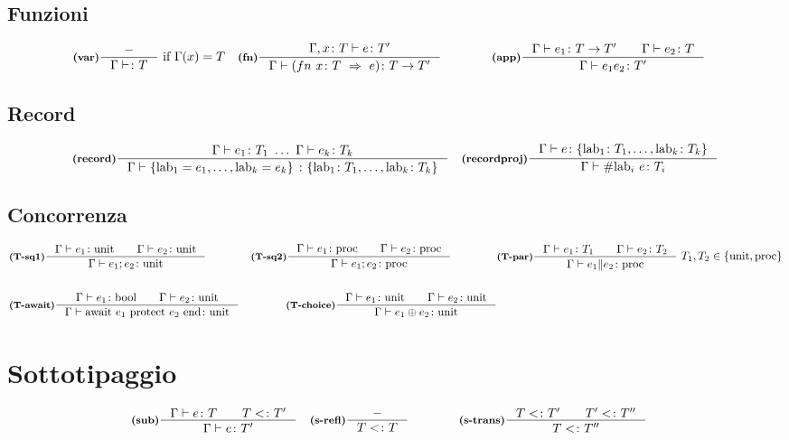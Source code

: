 \documentclass[a4paper, 10pt]{article}
\newcommand{\bool}{\textup{bool}}
\newcommand{\infer}[4]{\inference[\textbf{#1}]{#2}{#3}#4 }
\begin{document}
\subsection*{Funzioni}
	\begin{align*}
		&\infer{(var)}{-}{\Gamma \vdash \colon T}{\ \textup{if}\ \Gamma (x) = T} 
		&\infer{(fn)}{\Gamma , x \colon T \vdash e\colon T'}{\Gamma\vdash (fn\ x\colon T\ \Rightarrow\ e )\colon T\rightarrow T'}{} \qquad\qquad
		&\infer{(app)}{\Gamma \vdash e_1 \colon T \rightarrow T'\qquad \Gamma\vdash e_2\colon T}{\Gamma\vdash e_1 e_2\colon T'}{} 
	\end{align*}
\subsection*{Record}
	\begin{align*}
		&\infer{(record)}{\Gamma \vdash e_1 \colon T_1\ \dots\ \Gamma \vdash e_k \colon T_k}{\Gamma \vdash \{\text{lab}_1 = e_1, \dots, \text{lab}_k = e_k \}\ \colon \{\text{lab}_1 \colon T_1,\dots, \text{lab}_k\colon T_k  \} }{}
		&\infer{(recordproj)}{\Gamma\vdash e\colon \{\text{lab}_1\colon T_1,\dots, \text{lab}_k\colon T_k \} }{\Gamma\vdash \# \text{lab}_i\ e \colon T_i}{}
	\end{align*}
\subsection*{Concorrenza}
	\begin{align*}
		&\infer{(T-sq1)}{\Gamma\vdash e_1\colon\textup{unit}\qquad \Gamma\vdash e_2\colon\textup{unit}}{\Gamma\vdash e_1;e_2\colon \textup{unit}}{}
		&\infer{(T-sq2)}{\Gamma\vdash e_1\colon\textup{proc}\qquad \Gamma\vdash e_2\colon\textup{proc}}{\Gamma\vdash e_1;e_2\colon \textup{proc}}{} \qquad\qquad
		&\infer{(T-par)}{\Gamma\vdash e_1\colon T_1\qquad \Gamma\vdash e_2\colon T_2}{\Gamma\vdash e_1 \| e_2\colon \textup{proc}}{\ T_1, T_2 \in \{\textup{unit}, \textup{proc}\}} \\ \\
		&\infer{(T-await)}{\Gamma\vdash e_1 \colon \bool\qquad \Gamma\vdash e_2\colon \textup{unit}}{
			\Gamma\vdash \textup{await}\ e_1\ \textup{protect}\ e_2\ \textup{end}\colon \textup{unit} }{} 
		&\infer{(T-choice)}{\Gamma\vdash e_1 \colon \textup{unit}\qquad \Gamma\vdash e_2\colon \textup{unit}}{\Gamma\vdash e_1 \oplus e_2\colon \textup{unit}}{}
	\end{align*}
\section*{Sottotipaggio}
	\begin{align*}
		&\infer{(sub)}{\Gamma\vdash e \colon T\qquad T<\colon T'}{\Gamma\vdash e\colon T'}{}
		&\infer{(s-refl)}{-}{T<\colon T}{} \qquad\qquad
		&\infer{(s-trans)}{T<\colon T'\qquad T'<\colon T''}{T<\colon T''}{}
	\end{align*}
\end{document}
